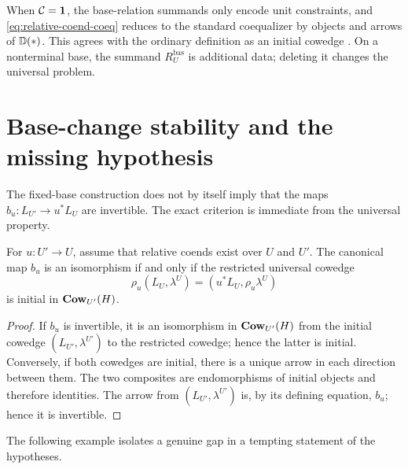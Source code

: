 \begin{remark}
\label{rem:ordinary-coeq-boundary}
When \(\mathcal{C}=\mathbf{1}\), the base-relation summands only encode unit constraints,
and \cref{eq:relative-coend-coeq} reduces to the standard coequalizer by
objects and arrows of \(\mathbb{D}(*)\).  This agrees with the ordinary definition as
an initial cowedge \cite[Definitions~1.1.4 and 1.1.6,
pp.~23--24]{Loregian2023}.  On a nonterminal base, the summand
\(R_U^{\mathrm{bas}}\) is additional data; deleting it changes the universal
problem.
\end{remark}


\section{Base-change stability and the missing hypothesis}
\label{sec:stability-criterion}

The fixed-base construction does not by itself imply that the maps
\(b_u:L_{U'}\to u^*L_U\) are invertible.  The exact criterion is immediate
from the universal property.

\begin{proposition}
\label{prop:stability-criterion}
For \(u:U'\to U\), assume that relative coends exist over \(U\) and
\(U'\).  The canonical map \(b_u\) is an isomorphism if and only if the
restricted universal cowedge
\[
  \rho_u(L_U,\lambda^U)=(u^*L_U,\rho_u\lambda^U)
\]
is initial in \(\mathbf{Cow}_{U'}(H)\).
\end{proposition}

\begin{proof}
If \(b_u\) is invertible, it is an isomorphism in \(\mathbf{Cow}_{U'}(H)\) from the
initial cowedge \((L_{U'},\lambda^{U'})\) to the restricted cowedge; hence
the latter is initial.  Conversely, if both cowedges are initial, there is a
unique arrow in each direction between them.  The two composites are
endomorphisms of initial objects and therefore identities.  The arrow from
\((L_{U'},\lambda^{U'})\) is, by its defining equation, \(b_u\); hence it is
invertible.
\end{proof}

The following example isolates a genuine gap in a tempting statement of the
hypotheses.

